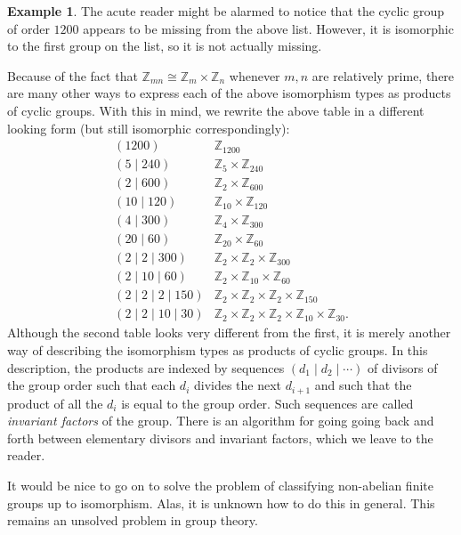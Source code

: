 \documentclass[11pt,oneside]{article}
\theoremstyle{definition}
\newtheorem{example}[thm]{Example}
\newcommand{\Z}{\mathbb{Z}} %
\begin{document}
\begin{example}
The acute reader might be alarmed to notice that the cyclic group of
order $1200$ appears to be missing from the above list. However, it is
isomorphic to the first group on the list, so it is not actually
missing.

Because of the fact that $\Z_{mn} \cong \Z_m \times \Z_n$ whenever
$m,n$ are relatively prime, there are many other ways to express each
of the above isomorphism types as products of cyclic groups. With this
in mind, we rewrite the above table in a different looking form (but
still isomorphic correspondingly):
\[
\begin{array}{ll}
  (1200) & \Z_{1200} \\ (5 \mid 240) & \Z_5 \times \Z_{240} \\ (2 \mid
  600) & \Z_2 \times \Z_{600} \\ (10 \mid 120) & \Z_{10} \times
  \Z_{120} \\ (4 \mid 300) & \Z_4 \times \Z_{300} \\ (20 \mid 60) &
  \Z_{20} \times \Z_{60} \\ (2 \mid 2 \mid 300) & \Z_{2} \times \Z_{2}
  \times \Z_{300} \\ (2 \mid 10 \mid 60) & \Z_{2} \times \Z_{10}
  \times \Z_{60} \\ (2 \mid 2 \mid 2 \mid 150) & \Z_2 \times \Z_2
  \times \Z_2 \times \Z_{150} \\
  (2 \mid 2 \mid 10 \mid 30) & \Z_2 \times \Z_2
  \times \Z_2 \times \Z_{10} \times \Z_{30}.
\end{array}
\]
Although the second table looks very different from the first, it is
merely another way of describing the isomorphism types as products of
cyclic groups. In this description, the products are indexed by
sequences $(d_1 \mid d_2 \mid \cdots)$ of divisors of the group order
such that each $d_i$ divides the next $d_{i+1}$ and such that the
product of all the $d_i$ is equal to the group order. Such sequences
are called \emph{invariant factors} of the
group. There is an algorithm for going going back and forth between
elementary divisors and invariant factors, which we leave to the
reader.
\end{example}


It would be nice to go on to solve the problem of classifying
non-abelian finite groups up to isomorphism.  Alas, it is unknown how
to do this in general. This remains an unsolved problem in group
theory.
\end{document}
